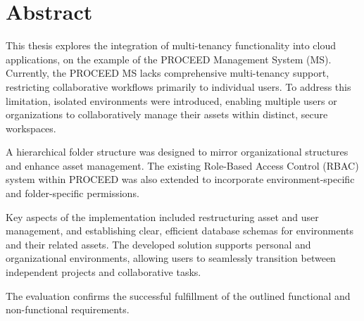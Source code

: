 \chapter*{Abstract}
\label{cha:abstract}

This thesis explores the integration of multi-tenancy functionality into cloud
applications, on the example of the PROCEED Management System (MS).
Currently, the PROCEED MS lacks comprehensive multi-tenancy support, restricting collaborative workflows primarily to individual users.
To address this limitation, isolated environments were introduced, enabling multiple users
or organizations to collaboratively manage their assets within distinct, secure
workspaces.

A hierarchical folder structure was designed to mirror organizational structures and enhance asset management.
The existing Role-Based Access Control (RBAC) system within PROCEED was also extended to incorporate environment-specific and folder-specific permissions.

Key aspects of the implementation included restructuring asset and user management,
and establishing clear, efficient database schemas for environments and their related assets.
The developed solution supports personal and organizational environments, allowing users to seamlessly transition between independent projects and collaborative tasks.

The evaluation confirms the successful fulfillment of the outlined functional and
non-functional requirements.
